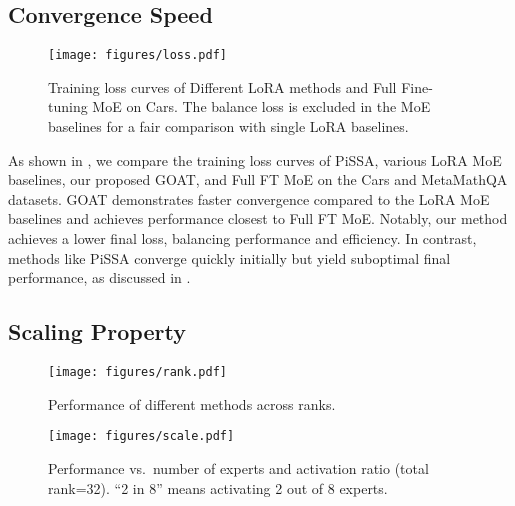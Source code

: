 
\subsection{Convergence Speed}

\begin{figure}[h]
\vspace{-10pt}
    \centering
    \texttt{[image: figures/loss.pdf]}
    \vspace{-20pt}
    \caption{Training loss curves of Different LoRA methods and Full Fine-tuning MoE on Cars. {The balance loss is excluded in the MoE baselines for a fair comparison with single LoRA baselines}.}
    \label{fig:loss}
    \vspace{-8pt}
\end{figure}

As shown in , we compare the training loss curves of PiSSA, various LoRA MoE baselines, our proposed GOAT, and Full FT MoE on the Cars and MetaMathQA datasets. GOAT demonstrates faster convergence compared to the LoRA MoE baselines and achieves performance closest to Full FT MoE. Notably, our method achieves a lower final loss, balancing performance and efficiency. In contrast, methods like PiSSA converge quickly initially but yield suboptimal final performance, as discussed in .

\subsection{Scaling Property}

\begin{figure}[h]
    \centering
    \texttt{[image: figures/rank.pdf]}
    \vspace{-16pt}
    \caption{Performance of different methods across ranks.\label{fig:r}}
    \vspace{-5mm}
\end{figure}

\begin{figure}[ht]
\vspace{-5pt}
    \centering
    \texttt{[image: figures/scale.pdf]}
    \vspace{-25pt}
\caption{Performance vs.~number of experts and activation ratio (total rank=32). ``2 in 8'' means activating 2 out of 8 experts.\label{fig:expert_scale}}
    \vspace{-15pt}
\end{figure}

